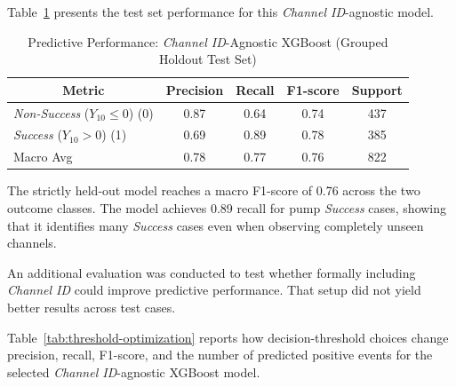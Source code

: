 Table~\ref{tab:classification-no-channel} presents the test set performance for this \textit{Channel ID}-agnostic model.

\begin{table}[htbp]
\centering
\caption[Predictive Performance: \textit{Channel ID}-Agnostic XGBoost]{Predictive Performance: \textit{Channel ID}-Agnostic XGBoost (Grouped Holdout Test Set)}
\label{tab:classification-no-channel}
\begin{tabular}{|l|c|c|c|c|}
\toprule
\multicolumn{1}{|c|}{\textbf{Metric}} & \multicolumn{1}{c|}{\textbf{Precision}} & \multicolumn{1}{c|}{\textbf{Recall}} & \multicolumn{1}{c|}{\textbf{F1-score}} & \multicolumn{1}{c|}{\textbf{Support}} \\
\midrule
\textit{Non-Success} ($Y_{10}\leq 0$) (0) & 0.87 & 0.64 & 0.74 & 437 \\
\textit{Success} ($Y_{10}>0$) (1) & 0.69 & 0.89 & 0.78 & 385 \\
\midrule
Macro Avg & 0.78 & 0.77 & 0.76 & 822 \\
\bottomrule
\end{tabular}
\end{table}

The strictly held-out model reaches a macro F1-score of 0.76 across the two outcome classes. The model achieves 0.89 recall for pump \textit{Success} cases, showing that it identifies many \textit{Success} cases even when observing completely unseen channels.

An additional evaluation was conducted to test whether formally including \textit{Channel ID} could improve predictive performance. That setup did not yield better results across test cases.

Table~\ref{tab:threshold-optimization} reports how decision-threshold choices change precision, recall, F1-score, and the number of predicted positive events for the selected \textit{Channel ID}-agnostic XGBoost model.

